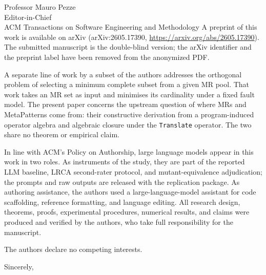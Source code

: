 \documentclass[11pt]{letter}
\begin{document}
\begin{letter}{Professor Mauro Pezze\\
Editor-in-Chief\\
ACM Transactions on Software Engineering and Methodology}
A preprint of this work is available on arXiv (arXiv:2605.17390, \url{https://arxiv.org/abs/2605.17390}). The submitted manuscript is the double-blind version; the arXiv identifier and the preprint label have been removed from the anonymized PDF.

A separate line of work by a subset of the authors addresses the orthogonal problem of selecting a minimum complete subset from a given MR pool. That work takes an MR set as input and minimises its cardinality under a fixed fault model. The present paper concerns the upstream question of where MRs and MetaPatterns come from: their constructive derivation from a program-induced operator algebra and algebraic closure under the \texttt{Translate} operator. The two share no theorem or empirical claim.

In line with ACM's Policy on Authorship, large language models appear in this work in two roles. As instruments of the study, they are part of the reported LLM baseline, LRCA second-rater protocol, and mutant-equivalence adjudication; the prompts and raw outputs are released with the replication package. As authoring assistance, the authors used a large-language-model assistant for code scaffolding, reference formatting, and language editing. All research design, theorems, proofs, experimental procedures, numerical results, and claims were produced and verified by the authors, who take full responsibility for the manuscript.

The authors declare no competing interests.

\closing{Sincerely,}

\end{letter}
\end{document}
